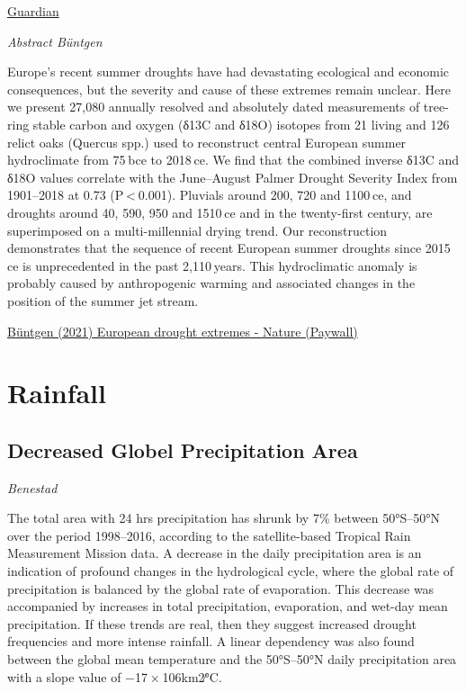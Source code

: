 \documentclass[
]{book}
\begin{document}
\href{https://www.theguardian.com/environment/2021/mar/15/climate-crisis-recent-european-droughts-worst-in-2000-years}{Guardian}

\emph{Abstract Büntgen}

Europe's recent summer droughts have had devastating ecological and economic consequences, but the severity and cause of these extremes remain unclear. Here we present 27,080 annually resolved and absolutely dated measurements of tree-ring stable carbon and oxygen (δ13C and δ18O) isotopes from 21 living and 126 relict oaks (Quercus spp.) used to reconstruct central European summer hydroclimate from 75 bce to 2018 ce. We find that the combined inverse δ13C and δ18O values correlate with the June--August Palmer Drought Severity Index from 1901--2018 at 0.73 (P \textless{} 0.001). Pluvials around 200, 720 and 1100 ce, and droughts around 40, 590, 950 and 1510 ce and in the twenty-first century, are superimposed on a multi-millennial drying trend. Our reconstruction demonstrates that the sequence of recent European summer droughts since 2015 ce is unprecedented in the past 2,110 years. This hydroclimatic anomaly is probably caused by anthropogenic warming and associated changes in the position of the summer jet stream.

\href{https://www.nature.com/articles/s41561-021-00698-0}{Büntgen (2021) European drought extremes - Nature (Paywall)}

\hypertarget{rainfall}{%
\chapter{Rainfall}\label{rainfall}}

\hypertarget{decreased-globel-precipitation-area}{%
\section{Decreased Globel Precipitation Area}\label{decreased-globel-precipitation-area}}

\emph{Benestad}

The total area with 24 hrs precipitation has shrunk by 7\% between 50°S--50°N over the period 1998--2016, according to the satellite-based Tropical Rain Measurement Mission data. A decrease in the daily precipitation area is an indication of profound changes in the hydrological cycle, where the global rate of precipitation is balanced by the global rate of evaporation. This decrease was accompanied by increases in total precipitation, evaporation, and wet-day mean precipitation. If these trends are real, then they suggest increased drought frequencies and more intense rainfall.
A linear dependency was also found between the global mean temperature and the 50°S--50°N daily precipitation area with a slope value of −17 × 106km2∕°C.
\end{document}

